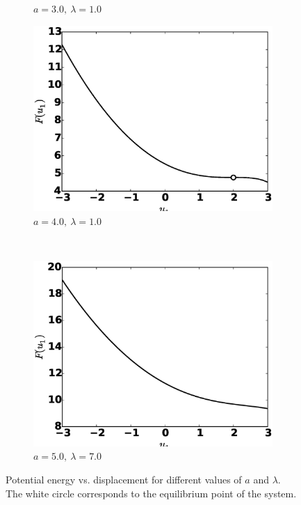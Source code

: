 \documentclass[12pt, a4paper]{extreport}
\begin{document}
\begin{figure}[H]
\begin{subfigure}[h]{8.0 cm}
		\caption{$a=3.0,\ \lambda = 1.0$}
	\end{subfigure}
	\begin{subfigure}[h]{8.0 cm}
        \includegraphics[width=8.0 cm]{figure/a40_lambda40.eps}
		\caption{$a=4.0,\ \lambda = 1.0$}
    \end{subfigure}
    \\
    	\begin{subfigure}[h]{8.0 cm}
        \includegraphics[width=8.0 cm]{figure/a50_lambda70.eps}
		\caption{$a=5.0,\ \lambda = 7.0$}
    \end{subfigure}
    \caption{Potential energy vs. displacement for different values of $a$ and $\lambda$. The white circle corresponds to the equilibrium point of the system.}
    \label{fig:potentialFunction}
\end{figure}
%
%
\end{document}
